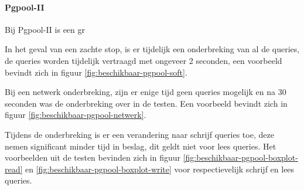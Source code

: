 \paragraph{Pgpool-II} Bij Pgpool-II is een gr\todo{}

In het geval van een zachte stop, is er tijdelijk een onderbreking van al de queries, de queries worden tijdelijk vertraagd met ongeveer 2 seconden, een voorbeeld bevindt zich in figuur \ref{fig:beschikbaar-pgpool-soft}. 

Bij een netwerk onderbreking, zijn er enige tijd geen queries mogelijk en na 30 seconden was de onderbreking over in de testen.  Een voorbeeld bevindt zich in figuur \ref{fig:beschikbaar-pgpool-netwerk}.  

Tijdens de onderbreking is er een verandering naar schrijf queries toe, deze nemen significant minder tijd in beslag, dit geldt niet voor lees queries. Het voorbeelden uit de testen bevinden zich in figuur \ref{fig:beschikbaar-pgpool-boxplot-read} en \ref{fig:beschikbaar-pgpool-boxplot-write} voor respectievelijk schrijf en lees queries. 
